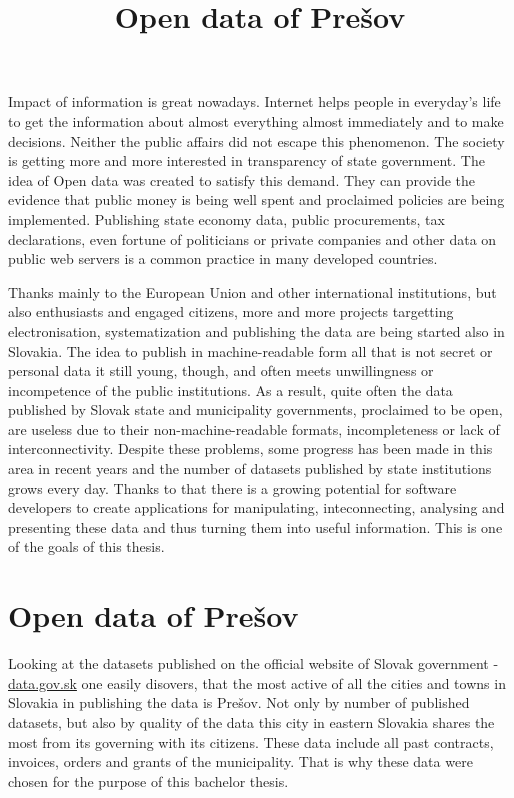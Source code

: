 \documentclass[thesis=B,english]{FITthesis}[2012/06/26]
\title{Open data of Prešov}
\begin{document}

\begin{introduction}
	Impact of information is great nowadays. Internet helps people in everyday's life to get the information about almost everything almost immediately and to make decisions.
	Neither the public affairs did not escape this phenomenon. The society is getting more and more interested in transparency of state government. The idea of Open data was created to satisfy this demand. They can provide the evidence that public money is being well spent and proclaimed policies are being implemented. Publishing state economy data, public procurements, tax declarations, even fortune of politicians or private companies and other data on public web servers is a common practice in many developed countries.
	\par Thanks mainly to the European Union and other international institutions, but also enthusiasts and engaged citizens, more and more projects targetting electronisation, systematization and publishing the data are being started also in Slovakia. The idea to publish in machine-readable form all that is not secret or personal data it still young, though, and often meets unwillingness or incompetence of the public institutions. As a result, quite often the data published by Slovak state and municipality governments, proclaimed to be open, are useless due to their non-machine-readable formats, incompleteness or lack of interconnectivity.
		Despite these problems, some progress has been made in this area in recent years and the number of datasets published by state institutions grows every day. Thanks to that there is a growing potential for software developers to create applications for manipulating, inteconnecting, analysing and presenting these data and thus turning them into useful information. This is one of the goals of this thesis.
	\section*{Open data of Prešov}
	Looking at the datasets published on the official website of Slovak government - \href{https://data.gov.sk}{data.gov.sk} one easily disovers, that the most active of all the cities and towns in Slovakia in publishing the data is Prešov. Not only by number of published datasets, but also by quality of the data this city in eastern Slovakia shares the most from its governing with its citizens. These data include all past contracts, invoices, orders and grants of the municipality. That is why these data were chosen for the purpose of this bachelor thesis.

\end{introduction}
\end{document}
